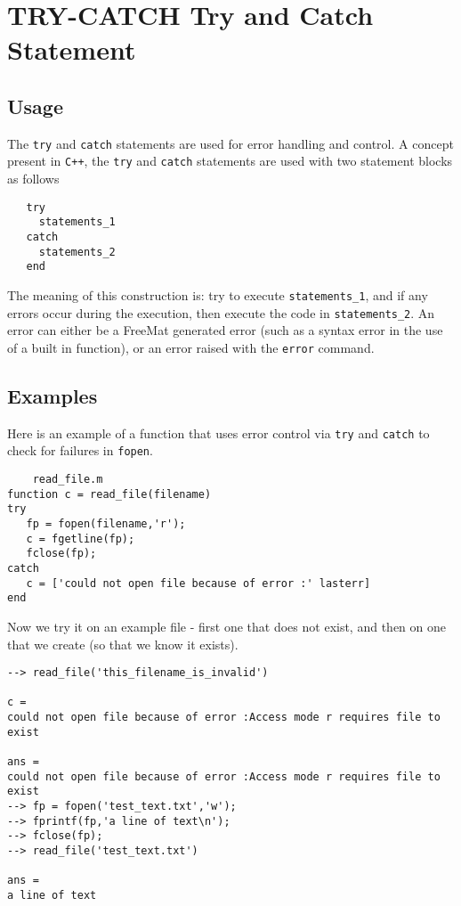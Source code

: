 \section{TRY-CATCH Try and Catch Statement}

\subsection{Usage}

The \verb|try| and \verb|catch| statements are used for error handling
and control.  A concept present in \verb|C++|, the \verb|try| and \verb|catch|
statements are used with two statement blocks as follows
\begin{verbatim}
   try
     statements_1
   catch
     statements_2
   end
\end{verbatim}
The meaning of this construction is: try to execute \verb|statements_1|,
and if any errors occur during the execution, then execute the
code in \verb|statements_2|.  An error can either be a FreeMat generated
error (such as a syntax error in the use of a built in function), or
an error raised with the \verb|error| command.
\subsection{Examples}

Here is an example of a function that uses error control via \verb|try|
and \verb|catch| to check for failures in \verb|fopen|.
\begin{verbatim}
    read_file.m
function c = read_file(filename)
try
   fp = fopen(filename,'r');
   c = fgetline(fp);
   fclose(fp);
catch
   c = ['could not open file because of error :' lasterr]
end
\end{verbatim}
Now we try it on an example file - first one that does not exist,
and then on one that we create (so that we know it exists).
\begin{verbatim}
--> read_file('this_filename_is_invalid')

c = 
could not open file because of error :Access mode r requires file to exist 

ans = 
could not open file because of error :Access mode r requires file to exist 
--> fp = fopen('test_text.txt','w');
--> fprintf(fp,'a line of text\n');
--> fclose(fp);
--> read_file('test_text.txt')

ans = 
a line of text
\end{verbatim}
